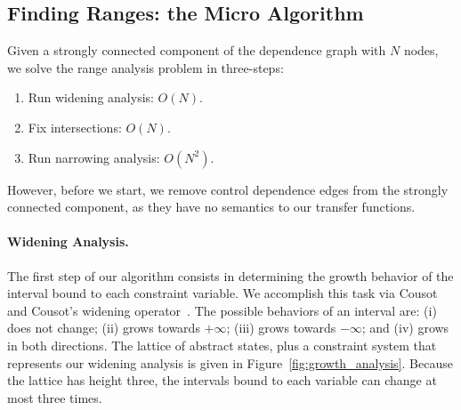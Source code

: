 \documentclass{llncs}
\begin{document}
\subsection{Finding Ranges: the Micro Algorithm}
\label{sub:micro}

Given a strongly connected component of the dependence graph with $N$ nodes,
we solve the range analysis problem in three-steps:
\begin{enumerate}
\item Run widening analysis: $O(N)$.

\item Fix intersections: $O(N)$.

\item Run narrowing analysis: $O(N^2)$.

\end{enumerate}
However, before we start, we remove control dependence edges from the
strongly connected component, as they have no semantics to our transfer
functions.

\paragraph{Widening Analysis.}

The first step of our algorithm consists in determining the growth behavior of
the interval bound to each constraint variable.
We accomplish this task via Cousot and Cousot's widening
operator~\cite[p.247]{Cousot77}.
The possible behaviors of an interval are:
(i) does not change;
(ii) grows towards $+\infty$;
(iii) grows towards $-\infty$; and
(iv) grows in both directions.
The lattice of abstract states, plus a constraint system that represents our
widening analysis is given in Figure~\ref{fig:growth_analysis}.
Because the lattice has height three, the intervals bound to each variable can
change at most three times.
\end{document}
